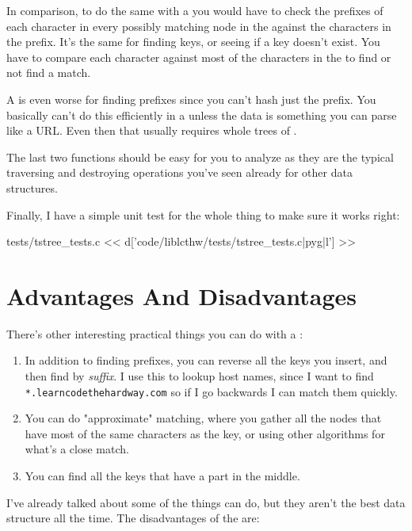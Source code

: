 In comparison, to do the same with a  you would have to check the
prefixes of each character in every possibly matching node in the 
against the characters in the prefix.  It's the same for finding keys, or seeing
if a key doesn't exist.  You have to compare each character against most of the
characters in the  to find or not find a match.

A  is even worse for finding prefixes since you can't hash just
the prefix.  You basically can't do this efficiently in a 
unless the data is something you can parse like a URL.  Even then that usually
requires whole trees of .

The last two functions should be easy for you to analyze as they are the typical
traversing and destroying operations you've seen already for other data structures.

Finally, I have a simple unit test for the whole thing to make sure it works
right:

\begin{code}{tests/tstree\_tests.c}
<< d['code/liblcthw/tests/tstree_tests.c|pyg|l'] >>
\end{code}

\section{Advantages And Disadvantages}

There's other interesting practical things you can do with a :

\begin{enumerate}
\item In addition to finding prefixes, you can reverse all the keys you insert,
    and then find by \emph{suffix}.  I use this to lookup host names, since
    I want to find \verb|*.learncodethehardway.com| so if I go backwards
    I can match them quickly.
\item You can do "approximate" matching, where you gather all the nodes that
    have most of the same characters as the key, or using other algorithms
    for what's a close match.
\item You can find all the keys that have a part in the middle.
\end{enumerate}

I've already talked about some of the things  can do, but they
aren't the best data structure all the time.  The disadvantages of the 
are:

